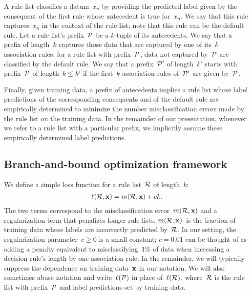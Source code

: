 A rule list classifies a datum~$x_n$ by providing the predicted label given
by the consequent of the first rule whose antecedent is true for~$x_n$.
%
We say that this rule captures~$x_n$ in the context of the rule list;
note that this rule can be the default rule.
%
Let a rule list's prefix~${\mathcal P}$ be a $k$-tuple of its antecedents.
%
We say that a prefix of length~$k$ captures those data that are captured
by one of its~$k$ association rules; for a rule list with prefix~${\mathcal P}$,
data not captured by~${\mathcal P}$ are classified by the default rule.
%
We say that a prefix~${\mathcal P}'$ of length~$k'$ starts with prefix~${\mathcal P}$ of
length~$k \le k'$ if the first~$k$ association rules of~${\mathcal P}'$ are given by~${\mathcal P}$.

Finally, given training data, a prefix of antecedents implies a rule list
whose label predictions of the corresponding consequents and of the default rule
are empirically determined to minimize the number misclassification errors made
by the rule list on the training data.
%
In the remainder of our presentation, whenever we refer to a rule list with a
particular prefix, we implicitly assume these empirically determined label predictions.

\subsection{Branch-and-bound optimization framework}

We define a simple loss function for a rule list~${\mathcal R}$ of length~$k$:
\begin{align}
\ell(\RL, \x) = m(\RL, \x) + c k.
\label{eq:objective}
\end{align}
The two terms correspond to the misclassification error~$m({\mathcal R}, \mathbf{x})$
and a regularization term that penalizes longer rule lists.
%
$m({\mathcal R}, \mathbf{x})$~is the fraction of training data whose labels are
incorrectly predicted by~${\mathcal R}$.
%
In our setting, the regularization parameter~${c \ge 0}$ is a small constant;
\eg ${c = 0.01}$ can be thought of as adding a penalty equivalent to misclassifying~$1\%$
of data when increasing a decision rule's length by one association rule.
%
In the remainder, we will typically suppress the dependence on training data~$\mathbf{x}$ in our notation.
%
We will also sometimes abuse notation and write~$\ell({\mathcal P})$ in place of~$\ell({\mathcal R})$,
where~${\mathcal R}$ is the rule list with prefix~${\mathcal P}$ and label predictions set by training data.

